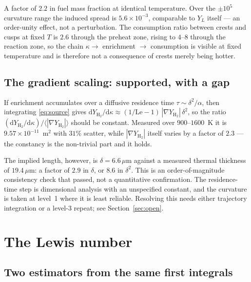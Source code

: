 \documentclass[11pt]{article}
\newcommand{\YH}{Y_{\mathrm{H_2}}}
\newcommand{\Le}{\mathrm{Le}}
\newcommand{\grad}{\nabla}
\begin{document}
A factor of $2.2$ in fuel mass fraction at identical temperature. Over the
$\pm10^{5}$ curvature range the induced spread is $5.6\times10^{-3}$,
comparable to $Y_L$ itself --- an order-unity effect, not a perturbation. The
consumption ratio between crests and cusps at fixed $T$ is $2.6$ through the
preheat zone, rising to $4$--$8$ through the reaction zone, so the chain
$\kappa \rightarrow$ enrichment $\rightarrow$ consumption is visible at fixed
temperature and is therefore not a consequence of crests merely being hotter.

\subsection{The gradient scaling: supported, with a gap}

If enrichment accumulates over a diffusive residence time $\tau \sim
\delta^2/\alpha$, then integrating \eqref{eq:source} gives
$\mathrm{d}\YH/\mathrm{d}\kappa \approx (1/\Le-1)\,|\grad \YH|\,\delta^2$, so
the ratio $(\mathrm{d}\YH/\mathrm{d}\kappa)/\langle|\grad \YH|\rangle$ should
be constant. Measured over $900$--$1600$~K it is $9.57\times10^{-11}$~m$^2$
with $31\%$ scatter, while $|\grad \YH|$ itself varies by a factor of $2.3$
--- the constancy is the non-trivial part and it holds.

The implied length, however, is $\delta = 6.6\,\mu$m against a measured
thermal thickness of $19.4\,\mu$m: a factor of $2.9$ in $\delta$, or $8.6$ in
$\delta^2$. This is an order-of-magnitude consistency check that passed, not a
quantitative confirmation. The residence-time step is dimensional analysis
with an unspecified constant, and the curvature is taken at level~1 where it
is least reliable. Resolving this needs either trajectory integration or a
level-3 repeat; see Section~\ref{sec:open}.

\section{The Lewis number}
\label{sec:lewis}

\subsection{Two estimators from the same first integrals}
\end{document}
